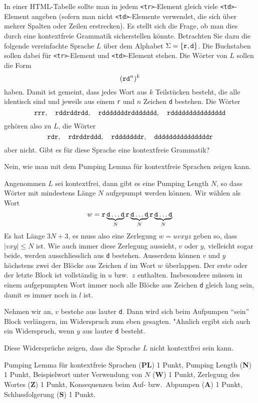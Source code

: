 In einer HTML-Tabelle sollte man in jedem {\tt <tr>}-Element gleich
viele {\tt <td>}-Element angeben (sofern man nicht {\tt <td>}-Elemente
verwendet, die sich über mehrer Spalten oder Zeilen erstrecken).
Es stellt sich die Frage, ob man dies durch eine kontextfreie Grammatik
sicherstellen könnte.
Betrachten Sie dazu die folgende vereinfachte Sprache $L$ über dem Alphabet
$\Sigma=\{\text{\tt r}, \text{\tt d}\}$. Die Buchstaben sollen
dabei für {\tt <tr>}-Element und {\tt <td>}-Element stehen.
Die Wörter von $L$ sollen die Form
\[
(\text{\tt rd}^n)^k
\]
haben. Damit ist gemeint, dass jedes Wort aus $k$ Teilstücken besteht,
die alle identisch sind und jeweils aus einem {\tt r} und $n$ Zeichen
{\tt d} bestehen. Die Wörter
\[
\text{\tt rrr}, \quad
\text{\tt rddrddrdd},\quad
\text{\tt rdddddddrddddddd},\quad
\text{\tt rddddddddddddddd}
\]
gehören also zu $L$, die Wörter
\[
\text{\tt rdr}, \quad
\text{\tt rdrddrddd},\quad
\text{\tt rdddddddr},\quad
\text{\tt dddddddddddddddr}
\]
aber nicht.
Gibt es für diese Sprache eine kontextfreie Grammatik?

\begin{loesung}
Nein, wie man mit dem Pumping Lemma für kontextfreie Sprachen zeigen kann.

Angenommen $L$ sei kontextfrei, dann gibt es eine Pumping Length $N$, so
dass Wörter mit mindestens Länge $N$ aufgepumpt werden können. 
Wir wählen als Wort
\[
w=\text{\tt r}
\underbrace{\text{\tt d}\dots\text{\tt d}}_{N}
\text{\tt r}
\underbrace{\text{\tt d}\dots\text{\tt d}}_{N}
\text{\tt r}
\underbrace{\text{\tt d}\dots\text{\tt d}}_{N}
\]
Es hat Länge $3N+3$, es muss also eine Zerlegung $w=uvxyz$ geben
so, dass $|vxy|\le N$ ist. Wie auch immer diese Zerlegung aussieht,
$v$ oder $y$, vielleicht sogar beide, werden ausschliesslich aus {\tt d}
bestehen. Ausserdem können $v$ und $y$ höchstens zwei der Blöcke
aus Zeichen $d$ im Wort $w$ überlappen. Der erste oder der letzte Block
ist vollständig in $u$ bzw.~$z$ enthalten. Insbesondere müssen in
einem aufgepumpten Wort immer noch alle Blöcke aus Zeichen {\tt d}
gleich lang sein, damit es immer noch in $l$ ist.

Nehmen wir an, $v$ bestehe aus lauter {\tt d}. Dann wird sich beim
Aufpumpen ``sein'' Block verlängern, im Widerspruch zum eben gesagten.
"Ahnlich ergibt sich auch ein Widerspruch, wenn  $y$ aus lauter {\tt d}
besteht.

Diese Widersprüche zeigen, dass die Sprache $L$ nicht kontextfrei sein
kann.
\end{loesung}

\begin{bewertung}
Pumping Lemma für kontextfreie Sprachen ({\bf PL}) 1 Punkt,
Pumping Length ({\bf N}) 1 Punkt,
Beispielwort unter Verwendung von $N$ ({\bf W}) 1 Punkt,
Zerlegung des Wortes ({\bf Z}) 1 Punkt,
Konsequenzen beim Auf- bzw.~Abpumpen ({\bf A}) 1 Punkt,
Schlussfolgerung ({\bf S}) 1 Punkt.
\end{bewertung}
